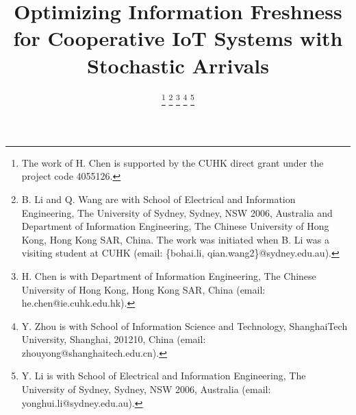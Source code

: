 \documentclass{IEEEtran}
\begin{document}
\title{Optimizing Information Freshness for Cooperative IoT Systems with Stochastic Arrivals
}


\author{
	\thanks{The work of H. Chen is supported by the CUHK direct grant under the project code 4055126.}
	\thanks{B. Li and Q. Wang are with School of Electrical
		and Information Engineering, The University of Sydney, Sydney, NSW
		2006, Australia and Department of Information Engineering, The Chinese University of Hong Kong, Hong Kong SAR, China. The work was initiated when B. Li was a visiting student at CUHK (email: \{bohai.li, qian.wang2\}@sydney.edu.au).}%
	\thanks{H. Chen is with Department of Information Engineering, The Chinese University of Hong Kong, Hong Kong SAR, China (email: he.chen@ie.cuhk.edu.hk).}%
	\thanks{Y. Zhou is with School of Information Science and Technology, ShanghaiTech University, Shanghai, 201210, China (email: zhouyong@shanghaitech.edu.cn).}
	\thanks{Y. Li is with School of Electrical
		and Information Engineering, The University of Sydney, Sydney, NSW
		2006, Australia (email: yonghui.li@sydney.edu.au).}
}



\maketitle
\end{document}
